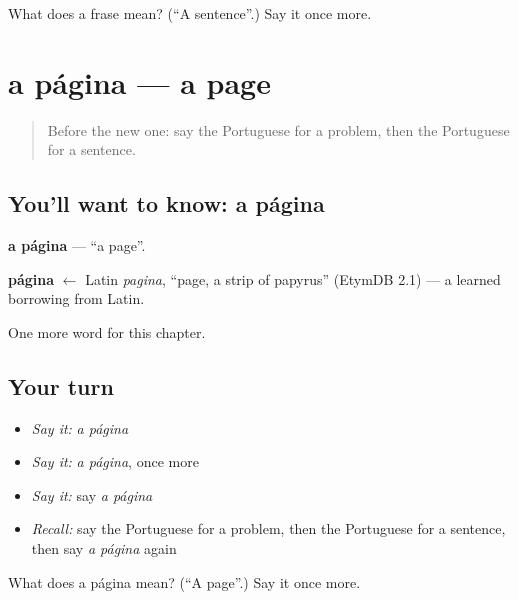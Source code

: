 \begin{tcolorbox}[breakable,colback=teal!4,colframe=teal!35!black,title={Before you move on}]
What does a frase mean? (\textquotedblleft{}A sentence\textquotedblright{}.) Say it once more.
\end{tcolorbox}
\section[a página]{a página — a page}

\label{lesson:PT-C114-pagina}



\begin{quote}
Before the new one: say the Portuguese for a problem, then the Portuguese for a sentence.
\end{quote}

\subsection*{You'll want to know: a página}
\textbf{a página} — \textquotedblleft{}a page\textquotedblright{}.

\begin{cousinweb}
\textbf{página} $\leftarrow$ Latin \emph{pagina}, \textquotedblleft{}page, a strip of papyrus\textquotedblright{} (EtymDB 2.1) — a learned borrowing from Latin.
\end{cousinweb}

\begin{grammarlens}[title={What you've built}]
One more word for this chapter.
\end{grammarlens}

\subsection*{Your turn}
\begin{itemize}
\raggedright
  \item \emph{Say it:} \emph{a página}
  \item \emph{Say it:} \emph{a página}, once more
  \item \emph{Say it:} say \emph{a página}
  \item \emph{Recall:} say the Portuguese for a problem, then the Portuguese for a sentence, then say \emph{a página} again
\end{itemize}

\begin{tcolorbox}[breakable,colback=teal!4,colframe=teal!35!black,title={Before you move on}]
What does a página mean? (\textquotedblleft{}A page\textquotedblright{}.) Say it once more.
\end{tcolorbox}
